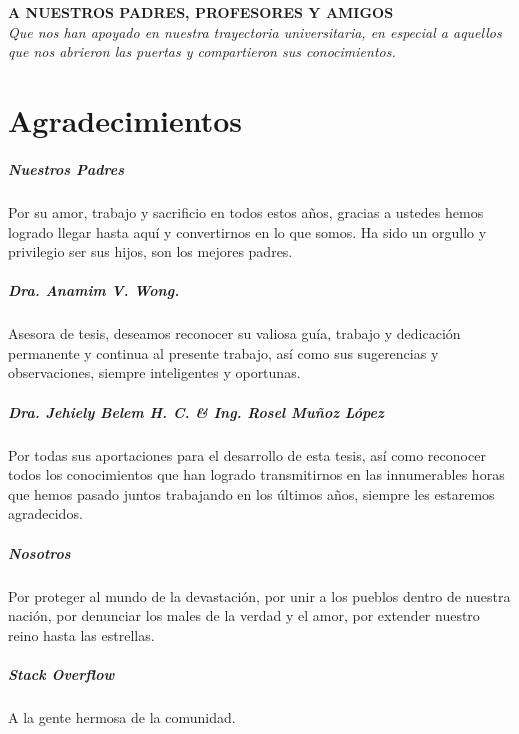 \chapter*{}
\begin{flushright}
	\vfill
	\textbf{A NUESTROS PADRES, PROFESORES Y AMIGOS}\\
	\textit{Que nos han apoyado en nuestra trayectoria universitaria, en especial a aquellos\\ que nos abrieron las puertas y compartieron sus conocimientos.}
	\vfill
\end{flushright}

\chapter*{Agradecimientos}

\paragraph{Nuestros Padres}

Por su amor, trabajo y sacrificio en todos estos años, gracias a ustedes hemos logrado llegar hasta aquí y convertirnos en lo que somos. Ha sido un orgullo y privilegio ser sus hijos, son los mejores padres.
\newline

\paragraph{Dra. Anamim V. Wong.}

Asesora de tesis, deseamos reconocer su valiosa guía, trabajo y dedicación permanente y continua al presente trabajo, así como sus sugerencias y observaciones, siempre inteligentes y oportunas.
\newline

\paragraph{Dra. Jehiely Belem H. C.  \& Ing. Rosel Muñoz López}

Por todas sus aportaciones para el desarrollo de esta tesis, así como reconocer todos los conocimientos que han logrado transmitirnos en las innumerables horas que hemos pasado juntos trabajando en los últimos años, siempre les estaremos agradecidos.
\newline

\paragraph{Nosotros}

Por proteger al mundo de la devastación, por unir a los pueblos dentro de nuestra nación, por denunciar los males de la verdad y el amor, por extender nuestro reino hasta las estrellas. 
\newline

\paragraph{Stack Overflow}
A la gente hermosa de la comunidad.
